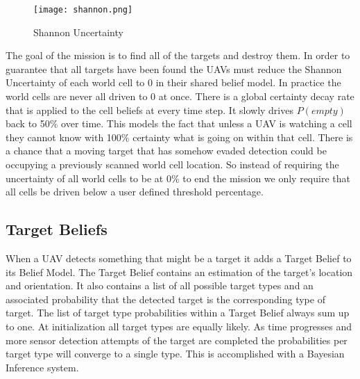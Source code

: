 \begin{multicols*}{2}
	
	\begin{figure}[H]
		\centering
		\texttt{[image: shannon.png]}
		\caption{Shannon Uncertainty}
		\label{fig:shannon}
	\end{figure}
	
The goal of the mission is to find all of the targets and destroy them.  In order to guarantee that all targets have been found the UAVs must reduce the Shannon Uncertainty of each world cell to 0 in their shared belief model.  In practice the world cells are never all driven to 0 at once.  There is a global certainty decay rate that is applied to the cell beliefs at every time step.  It slowly drives $P(empty)$ back to 50\% over time.  This models the fact that unless a UAV is watching a cell they cannot know with 100\% certainty what is going on within that cell.  There is a chance that a moving target that has somehow evaded detection could be occupying a previously scanned world cell location.  So instead of requiring the uncertainty of all world cells to be at 0\% to end the mission we only require that all cells be driven below a user defined threshold percentage.

\subsection{Target Beliefs}
When a UAV detects something that might be a target it adds a Target Belief to its Belief Model.  The Target Belief contains an estimation of the target's location and orientation.  It also contains a list of all possible target types and an associated probability that the detected target is the corresponding type of target. The list of target type probabilities within a Target Belief always sum up to one.  At initialization all target types are equally likely.  As time progresses and more sensor detection attempts of the target are completed the probabilities per target type will converge to a single type.  This is accomplished with a Bayesian Inference system.  


\end{multicols*}
